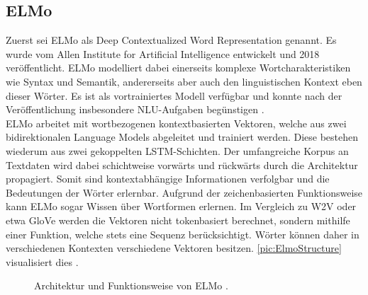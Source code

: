 \subsection{ELMo}
\noindent
Zuerst sei \ac{ELMo} als Deep Contextualized Word Representation genannt. Es wurde vom Allen Institute for Artificial Intelligence entwickelt und 2018 veröffentlicht. \ac{ELMo} modelliert dabei einerseits komplexe Wortcharakteristiken wie Syntax und Semantik, andererseits aber auch den linguistischen Kontext eben dieser Wörter. Es ist als vortrainiertes Modell verfügbar und konnte nach der Veröffentlichung insbesondere \ac{NLU}-Aufgaben begünstigen \cite[S.~1]{PET18}.\\

\noindent
\ac{ELMo} arbeitet mit wortbezogenen kontextbasierten Vektoren, welche aus zwei bidirektionalen Language Models abgeleitet und trainiert werden. Diese bestehen wiederum aus zwei gekoppelten \ac{LSTM}-Schichten. Der umfangreiche Korpus an Textdaten wird dabei schichtweise vorwärts und rückwärts durch die Architektur propagiert. Somit sind kontextabhängige Informationen verfolgbar und die Bedeutungen der Wörter erlernbar. Aufgrund der zeichenbasierten Funktionsweise kann \ac{ELMo} sogar Wissen über Wortformen erlernen. Im Vergleich zu \ac{W2V} oder etwa \ac{GloVe} werden die Vektoren nicht tokenbasiert berechnet, sondern mithilfe einer Funktion, welche stets eine Sequenz berücksichtigt. Wörter können daher in verschiedenen Kontexten verschiedene Vektoren besitzen. \autoref{pic:ElmoStructure} visualisiert dies \cite[S.~2-3]{PET18}.

\begin{figure}[h!]
  \centering
  \caption{Architektur und Funktionsweise von ELMo \cite{IRE18}.}
  \label{pic:ElmoStructure}
\end{figure}


